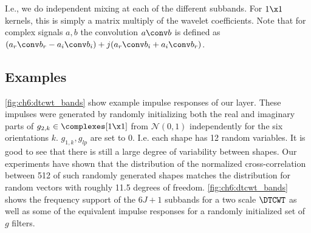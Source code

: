 I.e., we do independent mixing at each of the different subbands. For $1\x 1$
kernels, this is simply a matrix multiply of the wavelet coefficients. Note that
for complex signals $a, b$ the convolution $a \conv b$ is defined as $(a_r \conv
b_r - a_i \conv b_i) + j(a_r \conv b_i + a_i \conv b_r)$.


\subsection{Examples}
\autoref{fig:ch6:dtcwt_bands} show example impulse responses of our layer.
These impulses were generated by randomly initializing both the real and
imaginary parts of $g_{2,k} \in \complexes[1\x 1]$ from $\mathcal{N}(0,1)$
independently for the six orientations $k$. $g_{1,k}, g_{lp}$ are set to 0. 
I.e. each shape has 12 random variables. It is good
to see that there is still a large degree of variability between shapes. Our
experiments have shown that the distribution of the normalized cross-correlation
between 512 of such randomly generated shapes matches the distribution for
random vectors with roughly 11.5 degrees of freedom.
\autoref{fig:ch6:dtcwt_bands} shows the frequency support of the $6J+1$ subbands
for a two scale $\DTCWT$ as well as some of the equivalent impulse responses for
a randomly initialized set of $g$ filters.


